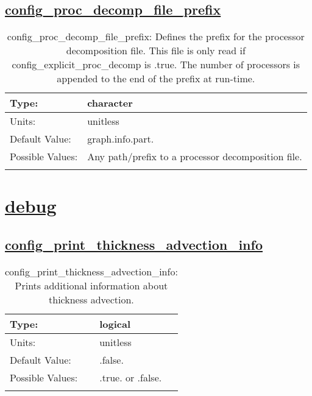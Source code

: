 \subsection[config\_proc\_decomp\_file\_prefix]{\hyperref[sec:nm_tab_decomposition]{config\_proc\_decomp\_file\_prefix}}
\label{subsec:nm_sec_config_proc_decomp_file_prefix}
\begin{center}
\begin{longtable}{| p{2.0in} || p{4.0in} |}
    \hline
    Type: & character \\
    \hline
    Units: & \si{unitless} \\
    \hline
    Default Value: & graph.info.part. \\
    \hline
    Possible Values: & Any path/prefix to a processor decomposition file. \\
    \hline
    \caption{config\_proc\_decomp\_file\_prefix: Defines the prefix for the processor decomposition file. This file is only read if config\_explicit\_proc\_decomp is .true. The number of processors is appended to the end of the prefix at run-time.}
\end{longtable}
\end{center}
\section[debug]{\hyperref[sec:nm_tab_debug]{debug}}
\label{sec:nm_sec_debug}
\subsection[config\_print\_thickness\_advection\_info]{\hyperref[sec:nm_tab_debug]{config\_print\_thickness\_advection\_info}}
\label{subsec:nm_sec_config_print_thickness_advection_info}
\begin{center}
\begin{longtable}{| p{2.0in} || p{4.0in} |}
    \hline
    Type: & logical \\
    \hline
    Units: & \si{unitless} \\
    \hline
    Default Value: & .false. \\
    \hline
    Possible Values: & .true. or .false. \\
    \hline
    \caption{config\_print\_thickness\_advection\_info: Prints additional information about thickness advection.}
\end{longtable}
\end{center}
